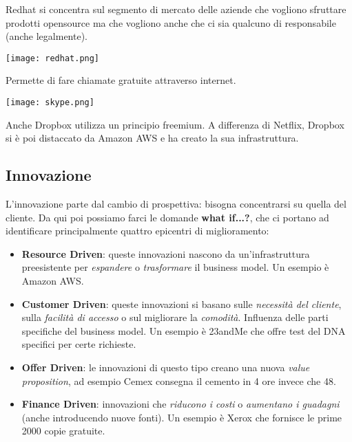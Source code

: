 \begin{example}[Redhat]
	Redhat si concentra sul segmento di mercato delle aziende che vogliono sfruttare prodotti opensource ma che vogliono anche che ci sia qualcuno di responsabile (anche legalmente).
	\begin{center}
		\texttt{[image: redhat.png]}
	\end{center}
\end{example}

\begin{example}[Skype]
	Permette di fare chiamate gratuite attraverso internet.
	\begin{center}
		\texttt{[image: skype.png]}
	\end{center}
\end{example}

\begin{note}
	Anche Dropbox utilizza un principio freemium. A differenza di Netflix, Dropbox si è poi distaccato da Amazon AWS e ha creato la sua infrastruttura.
\end{note}

\newpage
\subsection{Innovazione}
L'innovazione parte dal cambio di prospettiva: bisogna concentrarsi su quella del cliente. Da qui poi possiamo farci le domande \textbf{what if...?}, che ci portano ad identificare principalmente quattro epicentri di miglioramento:
\begin{itemize}
	\item \textbf{Resource Driven}: queste innovazioni nascono da un'infrastruttura preesistente per \textit{espandere} o \textit{trasformare} il business model. Un esempio è Amazon AWS.
	\item \textbf{Customer Driven}: queste innovazioni si basano sulle \textit{necessità del cliente}, sulla \textit{facilità di accesso} o sul migliorare la \textit{comodità}. Influenza delle parti specifiche del business model. Un esempio è 23andMe che offre test del DNA specifici per certe richieste.
	\item \textbf{Offer Driven}: le innovazioni di questo tipo creano una nuova \textit{value proposition}, ad esempio Cemex consegna il cemento in 4 ore invece che 48.
	\item \textbf{Finance Driven}: innovazioni che \textit{riducono i costi} o \textit{aumentano i guadagni} (anche introducendo nuove fonti). Un esempio è Xerox che fornisce le prime 2000 copie gratuite.
\end{itemize}

